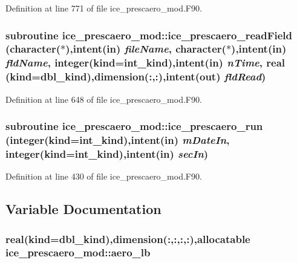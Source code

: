 Definition at line 771 of file ice\_\-prescaero\_\-mod.F90.\hypertarget{namespaceice__prescaero__mod_a0abb4e2f6271ccd9b7df6b797d3f6b4e}{
\subsubsection[{ice\_\-prescaero\_\-readField}]{\setlength{\rightskip}{0pt plus 5cm}subroutine ice\_\-prescaero\_\-mod::ice\_\-prescaero\_\-readField (character($\ast$),intent(in) {\em fileName}, \/  character($\ast$),intent(in) {\em fldName}, \/  integer(kind=int\_\-kind),intent(in) {\em nTime}, \/  real (kind=dbl\_\-kind),dimension(:,:),intent(out) {\em fldRead})}}
\label{namespaceice__prescaero__mod_a0abb4e2f6271ccd9b7df6b797d3f6b4e}


Definition at line 648 of file ice\_\-prescaero\_\-mod.F90.\hypertarget{namespaceice__prescaero__mod_a26d851ac89ccf10b178b800a3c9a3c68}{
\subsubsection[{ice\_\-prescaero\_\-run}]{\setlength{\rightskip}{0pt plus 5cm}subroutine ice\_\-prescaero\_\-mod::ice\_\-prescaero\_\-run (integer(kind=int\_\-kind),intent(in) {\em mDateIn}, \/  integer(kind=int\_\-kind),intent(in) {\em secIn})}}
\label{namespaceice__prescaero__mod_a26d851ac89ccf10b178b800a3c9a3c68}


Definition at line 430 of file ice\_\-prescaero\_\-mod.F90.

\subsection{Variable Documentation}
\hypertarget{namespaceice__prescaero__mod_acd22778b78cac460f018ccef7ec19441}{
\subsubsection[{aero\_\-lb}]{\setlength{\rightskip}{0pt plus 5cm}real(kind=dbl\_\-kind),dimension(:,:,:,:),allocatable {\bf ice\_\-prescaero\_\-mod::aero\_\-lb}}}
\label{namespaceice__prescaero__mod_acd22778b78cac460f018ccef7ec19441}


